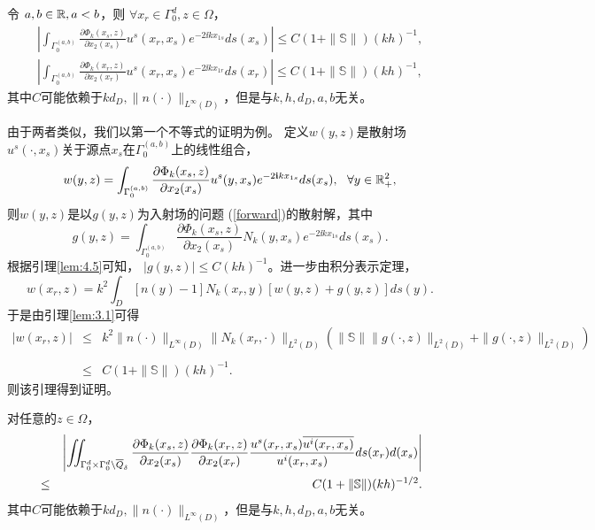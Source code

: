 \finproof
\begin{lemma}\label{lem:4.6}
令 $a,b\in\mathbb{R}, a<b$，则 $\forall x_r\in\Gamma_0^d,z\in\Omega$，
\begin{eqnarray*}
    \left|\int_{\Gamma_0^{(a,b)}}\frac{\partial\Phi_k(x_s,z)}{\partial x_2(x_s)} u^s(x_r,x_s) e^{-2\ii k x_{1s}} ds(x_s)\right|\leq C(1 + \|\mathbb{S}\|) (kh)^{-1},\\
    \left|\int_{\Gamma_0^{(a,b)}}\frac{\partial\Phi_k(x_r,z)}{\partial x_2(x_r)} u^s(x_r,x_s) e^{-2\ii k x_{1r}} ds(x_r)\right|\leq C(1 + \|\mathbb{S}\|) (kh)^{-1},
\end{eqnarray*}
其中$C$可能依赖于$kd_D,\|n(\cdot)\|_{L^{\infty}(D)}$，但是与$k, h, d_D,a,b$无关。
\end{lemma}

\debproof 由于两者类似，我们以第一个不等式的证明为例。
定义$w(y,z)$是散射场$u^s(\cdot,x_s)$关于源点$x_s$在$\Gamma_0^{(a,b)}$上的线性组合，
\begin{equation}
    w(y,z) =\int_{\Gamma_0^{(a,b)}} \frac{\partial\Phi_k(x_s,z)}{\partial x_2(x_s)} u^s(y,x_s) e^{-2\mathbf{i} k x_{1s}} ds(x_s),\ \ \forall y\in\mathbb{R}^2_+,
\end{equation}
则$w(y,z)$是以$g(y,z)$为入射场的问题 (\ref{forward})的散射解，其中
\begin{equation*}
    g(y,z)= \int_{\Gamma_0^{(a,b)}} \frac{\partial\Phi_k(x_s,z)}{\partial x_2(x_s)} N_k(y,x_s) e^{-2\ii k x_{1s}} ds(x_s).
\end{equation*}
根据引理\ref{lem:4.5}可知， $|g(y,z)|\leq C (kh)^{-1}$。进一步由积分表示定理，
\begin{equation*}
w(x_r,z)=k^2\int_{D}[n(y)-1]N_k(x_r,y)[w(y,z)+g(y,z)]ds(y).	
\end{equation*}
于是由引理\ref{lem:3.1}可得
$$
\begin{array}{lll}
|w(x_r,z)|&\leq&k^2\|n(\cdot)\|_{L^\infty(D)}\|N_k(x_r,\cdot)\|_{L^2(D)}(\|\mathbb{S}\|\|g(\cdot,z)\|_{L^2(D)}+\|g(\cdot,z)\|_{L^2(D)})\\
& &\\
&\leq&C(1+\|\mathbb{S}\|)(kh)^{-1}.
\end{array}
$$
则该引理得到证明。
\finproof
\begin{lemma}\label{lem:4.7}
对任意的$z\in\Omega$，
\begin{eqnarray*}
& &\left|\int\hskip-6pt\int_{\Gamma_0^d\times \Gamma_0^d\backslash \overline Q_\delta}\frac{\partial\Phi_k(x_s,z)}{\partial x_2(x_s)}\frac{\partial\Phi_k(x_r,z)}{\partial x_2(x_r)}\frac{u^s(x_r,x_s)
  \overline{u^i(x_r,x_s)}}{u^i(x_r,x_s)}ds(x_r)d(x_s)\right|\\
  &\leq& C(1+\|\mathbb{S}\|)(kh)^{-1/2}.
\end{eqnarray*}
其中$C$可能依赖于$kd_D,\|n(\cdot)\|_{L^{\infty}(D)}$，但是与$k, h, d_D,a,b$无关。
\end{lemma}
